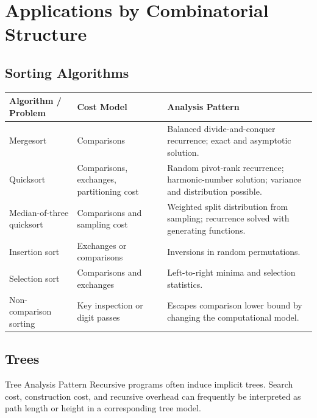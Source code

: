 \documentclass[11pt]{article}
\begin{document}
\section{Applications by Combinatorial Structure}

\subsection{Sorting Algorithms}

\begin{center}
\begin{tabularx}{\textwidth}{L{0.22\textwidth} L{0.27\textwidth} Y}
\toprule
\textbf{Algorithm / Problem} & \textbf{Cost Model} & \textbf{Analysis Pattern} \\
\midrule
Mergesort & Comparisons & Balanced divide-and-conquer recurrence; exact and asymptotic solution. \\
Quicksort & Comparisons, exchanges, partitioning cost & Random pivot-rank recurrence; harmonic-number solution; variance and distribution possible. \\
Median-of-three quicksort & Comparisons and sampling cost & Weighted split distribution from sampling; recurrence solved with generating functions. \\
Insertion sort & Exchanges or comparisons & Inversions in random permutations. \\
Selection sort & Comparisons and exchanges & Left-to-right minima and selection statistics. \\
Non-comparison sorting & Key inspection or digit passes & Escapes comparison lower bound by changing the computational model. \\
\bottomrule
\end{tabularx}
\end{center}

\subsection{Trees}

\begin{patternbox}{Tree Analysis Pattern}
Recursive programs often induce implicit trees. Search cost, construction cost, and recursive overhead can frequently be interpreted as path length or height in a corresponding tree model.
\end{patternbox}
\end{document}
